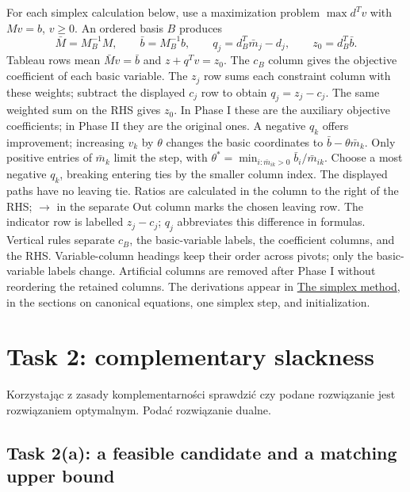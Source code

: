 \documentclass[11pt,a4paper]{article}
\begin{document}
For each simplex calculation below, use a maximization problem $\max d^Tv$
with $Mv=b$, $v\geq0$. An ordered basis $B$ produces
\[
  \bar M=M_B^{-1}M,\qquad \bar b=M_B^{-1}b,
  \qquad q_j=d_B^T\bar m_j-d_j,\qquad z_0=d_B^T\bar b.
\]
Tableau rows mean $\bar Mv=\bar b$ and $z+q^Tv=z_0$. The $c_B$ column gives the objective coefficient of each basic
variable. The $z_j$ row sums each constraint column with these weights;
subtract the displayed $c_j$ row to obtain $q_j=z_j-c_j$. The same
weighted sum on the RHS gives $z_0$. In Phase I these are the auxiliary
objective coefficients; in Phase II they are the original ones.
A negative $q_k$ offers improvement; increasing $v_k$ by $\theta$ changes
the basic coordinates to $\bar b-\theta\bar m_k$.
Only positive entries of $\bar m_k$ limit the step, with
$\theta^*=\min_{i:\bar m_{ik}>0}\bar b_i/\bar m_{ik}$.
Choose a most negative $q_k$, breaking entering ties by the smaller column
index. The displayed paths have no leaving tie. Ratios are calculated in the column to the right of the RHS;
$\longrightarrow$ in the separate Out column marks the chosen leaving row.
The indicator row is labelled $z_j-c_j$; $q_j$ abbreviates this difference
in formulas. Vertical rules separate $c_B$, the basic-variable labels,
the coefficient columns, and the RHS. Variable-column headings keep their
order across pivots; only the basic-variable labels change. Artificial
columns are removed after Phase I without reordering the retained columns.
The derivations appear in
\href{../lectures/03-simplex-method.pdf}{The simplex method}, in the sections
on canonical equations, one simplex step, and initialization.

\section{Task 2: complementary slackness}\label{sec:task-two}
\begin{otherlanguage}{polish}
  Korzystając z zasady komplementarności sprawdzić czy podane rozwiązanie jest
  rozwiązaniem optymalnym. Podać rozwiązanie dualne.
\end{otherlanguage}

\subsection{Task 2(a): a feasible candidate and a matching upper bound}
\end{document}
